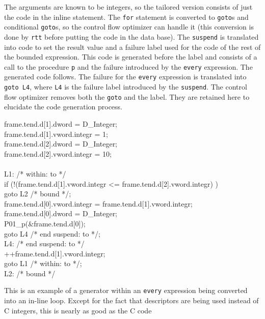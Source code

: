 \noindent
The arguments are known to be integers, so the tailored version
consists of just the code in the inline statement. The \texttt{for}
statement is converted to \texttt{goto}s and conditional
\texttt{goto}s, so the control flow optimizer can handle it (this
conversion is done by \texttt{rtt} before putting the code in the data
base). The \texttt{suspend} is translated into code to set the result
value and a failure label used for the code of the rest of the bounded
expression. This code is generated before the label and consists of a
call to the procedure \texttt{p} and the failure introduced by the
\texttt{every} expression. The generated code follows. The failure for
the \texttt{every} expression is translated into \texttt{goto L4},
where \texttt{L4} is the failure label introduced by the
\texttt{suspend}. The control flow optimizer removes both the
\texttt{goto} and the label. They are retained here to elucidate the
code generation process.

\goodbreak
\begin{iconcode}
\>\>frame.tend.d[1].dword = D\_Integer;\\
\>\>frame.tend.d[1].vword.integr = 1;\\
\>\>frame.tend.d[2].dword = D\_Integer;\\
\>\>frame.tend.d[2].vword.integr = 10;\\
\\
\>L1: /* within: to */\\
\>\>if (!(frame.tend.d[1].vword.integr <= frame.tend.d[2].vword.integr) )\\
\>\>\>goto L2 /* bound */;\\
\>\>frame.tend.d[0].vword.integr = frame.tend.d[1].vword.integr;\\
\>\>frame.tend.d[0].dword = D\_Integer;\\
\>\>P01\_p(\&frame.tend.d[0]);\\
\>\>goto L4 /* end suspend: to */;\\
\>L4: /* end suspend: to */\\
\>\>++frame.tend.d[1].vword.integr;\\
\>\>goto L1 /* within: to */;\\
\>L2: /* bound */\\
\end{iconcode}


This is an example of a generator within an \texttt{every} expression
being converted into an in-line loop. Except for the fact that
descriptors are being used instead of C integers, this is nearly as
good as the C code

